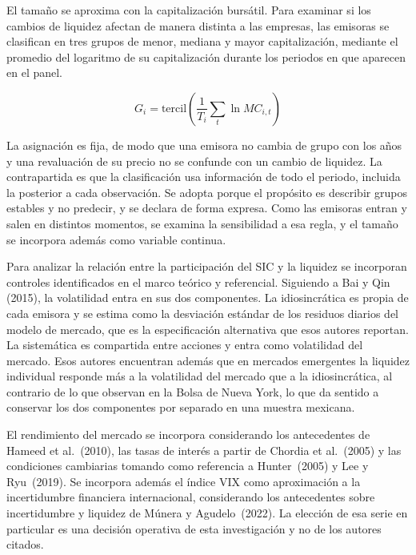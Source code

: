 El tamaño se aproxima con la capitalización bursátil. Para examinar si los cambios de liquidez afectan de manera distinta a las empresas, las emisoras se clasifican en tres grupos de menor, mediana y mayor capitalización, mediante el promedio del logaritmo de su capitalización durante los periodos en que aparecen en el panel.

\begin{equation}G_{i} = \text{tercil}\left( \frac{1}{T_{i}}\sum_{t}^{}\ln MC_{i,t} \right)\tag{9}\end{equation}

La asignación es fija, de modo que una emisora no cambia de grupo con los años y una revaluación de su precio no se confunde con un cambio de liquidez. La contrapartida es que la clasificación usa información de todo el periodo, incluida la posterior a cada observación. Se adopta porque el propósito es describir grupos estables y no predecir, y se declara de forma expresa. Como las emisoras entran y salen en distintos momentos, se examina la sensibilidad a esa regla, y el tamaño se incorpora además como variable continua.


Para analizar la relación entre la participación del SIC y la liquidez se incorporan controles identificados en el marco teórico y referencial. Siguiendo a Bai y Qin (2015), la volatilidad entra en sus dos componentes. La idiosincrática es propia de cada emisora y se estima como la desviación estándar de los residuos diarios del modelo de mercado, que es la especificación alternativa que esos autores reportan. La sistemática es compartida entre acciones y entra como volatilidad del mercado. Esos autores encuentran además que en mercados emergentes la liquidez individual responde más a la volatilidad del mercado que a la idiosincrática, al contrario de lo que observan en la Bolsa de Nueva York, lo que da sentido a conservar los dos componentes por separado en una muestra mexicana.

El rendimiento del mercado se incorpora considerando los antecedentes de Hameed et al.~(2010), las tasas de interés a partir de Chordia et al.~(2005) y las condiciones cambiarias tomando como referencia a Hunter~(2005) y Lee y Ryu~(2019). Se incorpora además el índice VIX como aproximación a la incertidumbre financiera internacional, considerando los antecedentes sobre incertidumbre y liquidez de Múnera y Agudelo~(2022). La elección de esa serie en particular es una decisión operativa de esta investigación y no de los autores citados.

